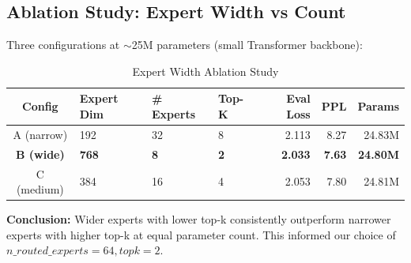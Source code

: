 \subsection{Ablation Study: Expert Width vs Count}

Three configurations at $\sim$25M parameters (small Transformer backbone):

\begin{table}[h]
    \centering
    \caption{Expert Width Ablation Study}
    \begin{tabular}{clllrrr}
        \toprule
        \textbf{Config} & \textbf{Expert Dim} & \textbf{\# Experts} & \textbf{Top-K} & \textbf{Eval Loss} & \textbf{PPL} & \textbf{Params} \\
        \midrule
        A (narrow) & 192 & 32 & 8 & 2.113 & 8.27 & 24.83M \\
        \textbf{B (wide)} & \textbf{768} & \textbf{8} & \textbf{2} & \textbf{2.033} & \textbf{7.63} & \textbf{24.80M} \\
        C (medium) & 384 & 16 & 4 & 2.053 & 7.80 & 24.81M \\
        \bottomrule
    \end{tabular}
\end{table}

\textbf{Conclusion:} Wider experts with lower top-k consistently outperform narrower experts with higher top-k at equal parameter count. This informed our choice of $n\_routed\_experts=64, topk=2$.
